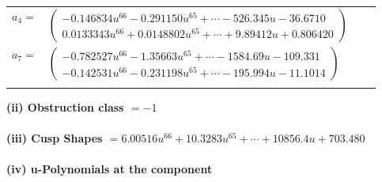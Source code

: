 \documentclass[1p]{elsarticle_modified}
\theoremstyle{definition}
\begin{document}
\begin{tabular}{m{7pt} m{180pt} m{7pt} m{180pt} }
\flushright $a_{4}=$&$\begin{pmatrix}-0.146834 u^{66}-0.291150 u^{65}+\cdots-526.345 u-36.6710\\0.0133343 u^{66}+0.0148802 u^{65}+\cdots+9.89412 u+0.806420\end{pmatrix}$ \\
\flushright $a_{7}=$&$\begin{pmatrix}-0.782527 u^{66}-1.35663 u^{65}+\cdots-1584.69 u-109.331\\-0.142531 u^{66}-0.231198 u^{65}+\cdots-195.994 u-11.1014\end{pmatrix}$\\&\end{tabular}
\flushleft \textbf{(ii) Obstruction class $= -1$}\\~\\
\flushleft \textbf{(iii) Cusp Shapes $= 6.00516 u^{66}+10.3283 u^{65}+\cdots+10856.4 u+703.480$}\\~\\
\newpage\renewcommand{\arraystretch}{1}
\flushleft \textbf{(iv) u-Polynomials at the component}\newline \\
\end{document}
